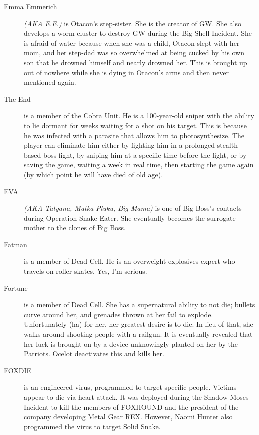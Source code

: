 \documentclass[12pt]{article}
\begin{document}
\begin{description}
	\item [Emma Emmerich] \textit{(AKA E.E.)} is Otacon's step-sister. She
		is the creator of GW. She also develops a worm cluster to
		destroy GW during the Big Shell Incident. She is afraid of
		water because when she was a child, Otacon slept with her mom,
		and her step-dad was so overwhelmed at being cucked by his own
		son that he drowned himself and nearly drowned her. This is
		brought up out of nowhere while she is dying in Otacon's arms
		and then never mentioned again.

	\item [The End] is a member of the Cobra Unit. He is a 100-year-old
		sniper with the ability to lie dormant for weeks waiting for a
		shot on his target. This is because he was infected with a
		parasite that allows him to photosynthesize. The player can
		eliminate him either by fighting him in a prolonged
		stealth-based boss fight, by sniping him at a specific time
		before the fight, or by saving the game, waiting a week in real
		time, then starting the game again (by which point he will have
		died of old age).

	\item [EVA] \textit{(AKA Tatyana, Matka Pluku, Big Mama)} is one of Big
		Boss's contacts during Operation Snake Eater. She eventually
		becomes the surrogate mother to the clones of Big Boss.

	\item [Fatman] is a member of Dead Cell. He is an overweight explosives
		expert who travels on roller skates. Yes, I'm serious.
	
	\item [Fortune] is a member of Dead Cell. She has a supernatural ability
		to not die; bullets curve around her, and grenades thrown at
		her fail to explode. Unfortunately (ha) for her, her greatest
		desire is to die. In lieu of that, she walks around shooting
		people with a railgun. It is eventually revealed that her luck
		is brought on by a device unknowingly planted on her by the
		Patriots. Ocelot deactivates this and kills her.

	\item [FOXDIE] is an engineered virus, programmed to target specific
		people. Victims appear to die via heart attack. It was deployed
		during the Shadow Moses Incident to kill the members of
		FOXHOUND and the president of the company developing Metal Gear
		REX. However, Naomi Hunter also programmed the virus to target
		Solid Snake.


\end{description}
\end{document}
